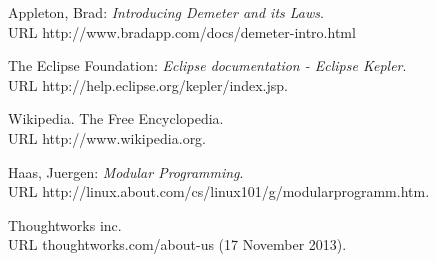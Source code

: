 \documentclass[12pt,a4paper,oneside, 
liststotoc, 					%
bibtotoc,						%
titlepage, 						%
headsepline, 					%
BCOR6mm,						%
english
]{scrreprt}
\begin{document}
\begin{thebibliography}{999999}
 Appleton, Brad:
\emph{Introducing Demeter and its Laws}. \\ URL http://www.bradapp.com/docs/demeter-intro.html

 The Eclipse Foundation: 
\emph{Eclipse documentation - Eclipse Kepler}. \\ URL http://help.eclipse.org/kepler/index.jsp.

 Wikipedia. The Free Encyclopedia. \\ URL http://www.wikipedia.org. 

 Haas, Juergen: \emph{Modular Programming}.\\ URL http://linux.about.com/cs/linux101/g/modularprogramm.htm.

 Thoughtworks inc. \\ URL thoughtworks.com/about-us  (17 November 2013).

\end{thebibliography}


\begin{appendix}
\clearpage
{}						%
\end{appendix}
\end{document}
